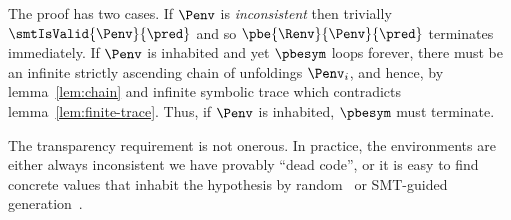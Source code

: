 The proof has two cases.
%
If $\Penv$ is \emph{inconsistent} then trivially $\smtIsValid{\Penv}{\pred}$
and so $\pbe{\Renv}{\Penv}{\pred}$ terminates immediately.
%
If $\Penv$ is inhabited and yet $\pbesym$ loops forever,
there must be an infinite strictly ascending chain of
unfoldings $\Penv_i$, and hence, by lemma~\ref{lem:chain}
and infinite symbolic trace which contradicts
lemma~\ref{lem:finite-trace}.
%
Thus, if $\Penv$ is inhabited, $\pbesym$ must terminate.

%
The transparency requirement is not onerous.
In practice, the environments are either always
inconsistent \ie we have provably ``dead code'',
or it is easy to find concrete values that inhabit
the hypothesis by random~\cite{Claessen00}
or SMT-guided generation~\cite{Seidel15}.
